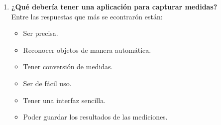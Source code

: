 \begin{enumerate}
	    \item \textbf{¿Qué debería tener una aplicación para capturar medidas?}\\
	    Entre las respuestas que más se econtrarón están:
	    \begin{itemize}
	    \item Ser precisa.
	    \item Reconocer objetos de manera automática.
	    \item Tener conversión de medidas.
	    \item Ser de fácil uso.
	    \item Tener una interfaz sencilla.
	    \item Poder guardar los resultados de las mediciones.
	    \end{itemize}
    \end{enumerate}
	